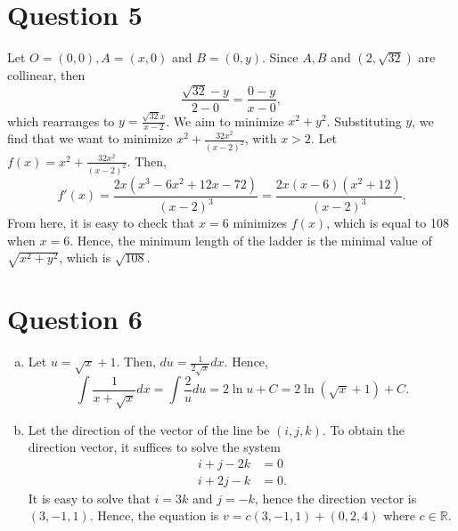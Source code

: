 \documentclass[12pt,a4paper]{article}
\begin{document}
	\section*{Question 5}
	
	Let $O = (0,0), A = (x,0)$ and $B=(0,y)$. Since $A,B$ and $(2,\sqrt{32})$ are collinear, then $$\frac{\sqrt{32}-y}{2-0} = \frac{0-y}{x-0},$$ which rearranges to $y = \frac{\sqrt{32}x}{x-2}$. We aim to minimize $x^2+y^2$. Substituting $y$, we find that we want to minimize $x^2+\frac{32x^2}{(x-2)^2}$, with $x>2$. Let $f(x) = x^2+\frac{32x^2}{(x-2)^2} $. Then, $$f'(x) =  \frac{2x(x^3-6x^2+12x-72)}{(x-2)^3} = \frac{2x(x-6)(x^2+12)}{(x-2)^3}.$$ From here, it is easy to check that $x=6$ minimizes $f(x)$, which is equal to 108 when $x=6$. Hence, the minimum length of the ladder is the minimal value of $\sqrt{x^2+y^2}$, which is $\sqrt{108}$.
	\section*{Question 6}
	\begin{enumerate}[a.]
	\item Let $u = \sqrt{x}+1$. Then, $du = \frac{1}{2\sqrt{x}} dx$. Hence, $$ \int \frac{1}{x+\sqrt{x}} dx = \int \frac{2}{u} du = 2 \ln{u} +C = 2 \ln(\sqrt{x}+1)+C.$$
	
	\item Let the direction of the vector of the line be $(i,j,k)$. To obtain the direction vector, it suffices to solve the system \begin{align}
	    i+j-2k &= 0 \\ 
	    i+2j-k &= 0.
	\end{align} It is easy to solve that $i=3k$ and $j=-k$, hence the direction vector is $(3,-1,1)$. Hence, the equation is $v = c(3,-1,1)+(0,2,4)$ where $c \in \mathbb{R}$.
	\end{enumerate}
	
\end{document}
